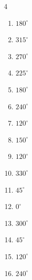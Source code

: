 \begin{multicols}{4}
\begin{enumerate}
  \item $\displaystyle 180^{\circ}$
        \phantom{$\displaystyle =\pi$}

  \item $\displaystyle 315^{\circ}$

  \item $\displaystyle 270^{\circ}$

  \item $\displaystyle 225^{\circ}$

  \item $\displaystyle 180^{\circ}$
        \phantom{$\displaystyle =\pi$}

  \item $\displaystyle 240^{\circ}$

  \item $\displaystyle 120^{\circ}$

  \item $\displaystyle 150^{\circ}$

  \item $\displaystyle 120^{\circ}$

  \item $\displaystyle 330^{\circ}$

  \item $\displaystyle 45^{\circ}$

  \item $\displaystyle 0^{\circ}$
        \phantom{$\displaystyle =0$}

  \item $\displaystyle 300^{\circ}$

  \item $\displaystyle 45^{\circ}$

  \item $\displaystyle 120^{\circ}$

  \item $\displaystyle 240^{\circ}$


\end{enumerate}
\end{multicols}
